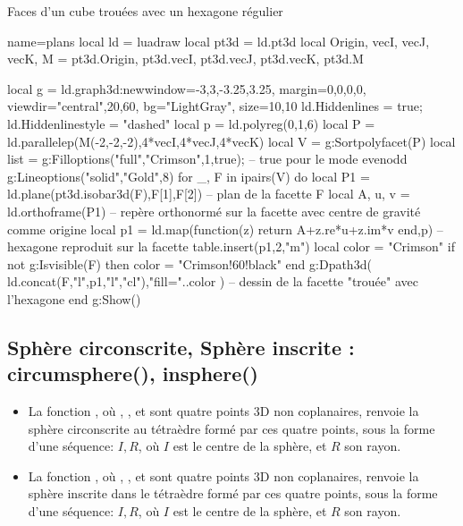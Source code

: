 \begin{demo}{Faces d'un cube trouées avec un hexagone régulier}
\begin{luadraw}{name=plans}
local ld = luadraw
local pt3d = ld.pt3d
local Origin, vecI, vecJ, vecK, M = pt3d.Origin, pt3d.vecI, pt3d.vecJ, pt3d.vecK, pt3d.M

local g = ld.graph3d:new{window={-3,3,-3.25,3.25}, margin={0,0,0,0},
    viewdir={"central",20,60}, bg="LightGray", size={10,10}}
ld.Hiddenlines = true; ld.Hiddenlinestyle = "dashed"
local p = ld.polyreg(0,1,6)
local P = ld.parallelep(M(-2,-2,-2),4*vecI,4*vecJ,4*vecK)
local V = g:Sortpolyfacet(P)
local list = {}
g:Filloptions("full","Crimson",1,true); -- true pour le mode evenodd
g:Lineoptions("solid","Gold",8)
for _, F in ipairs(V) do
    local P1 = ld.plane(pt3d.isobar3d(F),F[1],F[2]) -- plan de la facette F
    local A, u, v = ld.orthoframe(P1) -- repère orthonormé sur la facette avec centre de gravité comme origine
    local p1 = ld.map(function(z) return A+z.re*u+z.im*v end,p) -- hexagone reproduit sur la facette
    table.insert(p1,2,"m")
    local color = "Crimson"
    if not g:Isvisible(F) then color = "Crimson!60!black" end
    g:Dpath3d( ld.concat(F,{"l"},p1,{"l","cl"}),"fill="..color ) -- dessin de la facette "trouée" avec l'hexagone
end
g:Show()
\end{luadraw}
\end{demo}

\subsection{Sphère circonscrite, Sphère inscrite : circumsphere(), insphere()}

\begin{itemize}
    \item La fonction , où , ,  et  sont quatre points 3D non coplanaires, renvoie la sphère circonscrite au tétraèdre formé par ces quatre points, sous la forme d'une séquence: $I,R$, où $I$ est le centre de la sphère, et $R$ son rayon.
    
    \item La fonction , où , ,  et  sont quatre points 3D non coplanaires, renvoie la sphère inscrite dans le tétraèdre formé par ces quatre points, sous la forme d'une séquence: $I,R$, où $I$ est le centre de la sphère, et $R$ son rayon.
\end{itemize}

